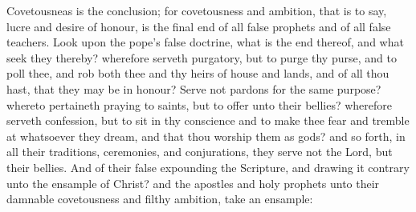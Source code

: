 Covetousneas is the conclusion; for covetousness and 
ambition, that is to say, lucre and desire of honour, is the 
final end of all false prophets and of all false teachers. 
Look upon the pope's false doctrine, what is the end 
thereof, and what seek they thereby? wherefore serveth 
purgatory, but to purge thy purse, and to poll thee, and 
rob both thee and thy heirs of house and lands, and of all 
thou hast, that they may be in honour? Serve not pardons 
for the same purpose? whereto pertaineth praying to 
saints, but to offer unto their bellies? wherefore serveth 
confession, but to sit in thy conscience and to make thee 
fear and tremble at whatsoever they dream, and that thou 
worship them as gods? and so forth, in all their traditions, 
ceremonies, and conjurations, they serve not the Lord, 
but their bellies. And of their false expounding the 
Scripture, and drawing it contrary unto the ensample of 
Christ? and the apostles and holy prophets unto their damnable
covetousness and filthy ambition, take an ensample: 

